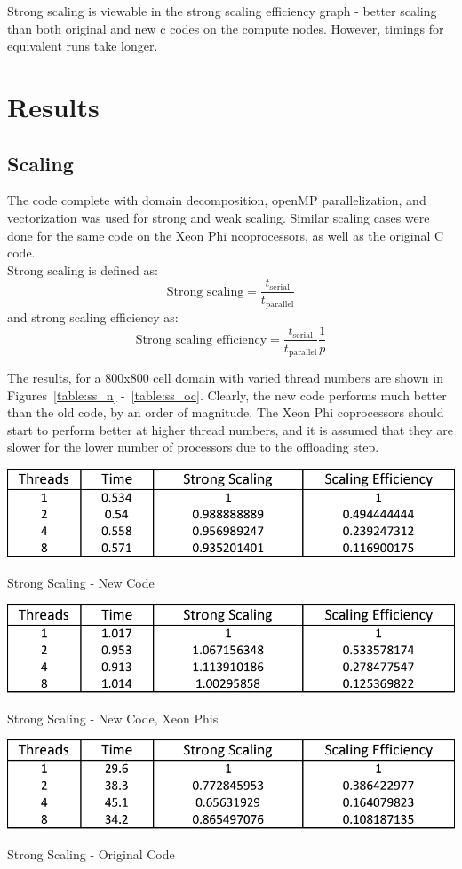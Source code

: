 \documentclass{article}
\begin{document}
Strong scaling is viewable in the strong scaling efficiency graph - better scaling than both original and new c codes on the compute nodes. However, timings for equivalent runs take longer.
\clearpage
\section{Results}
\subsection{Scaling}
The code complete with domain decomposition, openMP parallelization, and vectorization was used for strong and weak scaling. Similar scaling cases were done for the same code on the Xeon Phi ncoprocessors, as well as the original C code. \\

Strong scaling is defined as:
\begin{equation}
\textrm{Strong scaling} = \frac{t_{\textrm{serial}}}{t_{\textrm{parallel}}}
\end{equation}
\indent and strong scaling efficiency as:
\begin{equation}
\textrm{Strong scaling efficiency} =   \frac{t_{\textrm{serial}}}{t_{\textrm{parallel}}}\frac{1}{p}
\end{equation}

The results, for a 800x800 cell domain with varied thread numbers are shown in Figures~\ref{table:ss_n} -~\ref{table:ss_oc}. Clearly, the new code performs much better than the old code, by an order of magnitude. The Xeon Phi coprocessors should start to perform better at higher thread numbers, and it is assumed that they are slower for the lower number of processors due to the offloading step. \\

\begin{table}[here]
 \centering
 \includegraphics[width=0.4\linewidth]{SS_newC.png}
 \caption{Strong Scaling - New Code}
 \label{table:ss_n}
\end{table}
\begin{table}[here]
 \centering
 \includegraphics[width=0.4\linewidth]{SS_XP.png}
 \caption{Strong Scaling - New Code, Xeon Phis}
 \label{table:ss_xp}
\end{table}
\clearpage
\begin{table}[here]
 \centering
 \includegraphics[width=0.4\linewidth]{SS_oldC.png}
 \caption{Strong Scaling - Original Code}
 \label{table:ss_oc}
\end{table}
\end{document}
